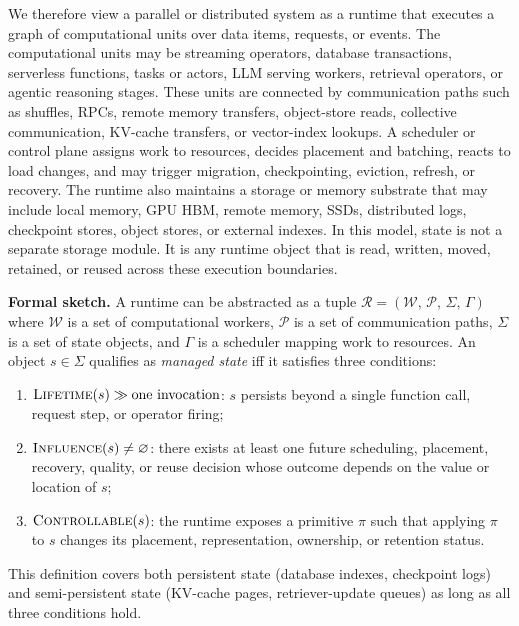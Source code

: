 \documentclass[acmsmall,screen,review]{acmart}
\begin{document}
We therefore view a parallel or distributed system as a runtime that executes a graph of computational units over data items, requests, or events. The computational units may be streaming operators, database transactions, serverless functions, tasks or actors, LLM serving workers, retrieval operators, or agentic reasoning stages. These units are connected by communication paths such as shuffles, RPCs, remote memory transfers, object-store reads, collective communication, KV-cache transfers, or vector-index lookups. A scheduler or control plane assigns work to resources, decides placement and batching, reacts to load changes, and may trigger migration, checkpointing, eviction, refresh, or recovery. The runtime also maintains a storage or memory substrate that may include local memory, GPU HBM, remote memory, SSDs, distributed logs, checkpoint stores, object stores, or external indexes. In this model, state is not a separate storage module. It is any runtime object that is read, written, moved, retained, or reused across these execution boundaries.

\smallskip\noindent\textbf{Formal sketch.}
A runtime can be abstracted as a tuple \(\mathcal{R}=(\mathcal{W},\,\mathcal{P},\,\Sigma,\,\Gamma)\) where
\(\mathcal{W}\) is a set of computational workers,
\(\mathcal{P}\) is a set of communication paths,
\(\Sigma\) is a set of state objects, and
\(\Gamma\) is a scheduler mapping work to resources.
An object \(s\in\Sigma\) qualifies as \emph{managed state} iff it satisfies three conditions:
\begin{enumerate}[leftmargin=*,nosep]
\item \(\textsc{Lifetime}(s)\gg\text{one invocation}\): \(s\) persists beyond a single function call, request step, or operator firing;
\item \(\textsc{Influence}(s)\neq\varnothing\): there exists at least one future scheduling, placement, recovery, quality, or reuse decision whose outcome depends on the value or location of \(s\);
\item \(\textsc{Controllable}(s)\): the runtime exposes a primitive \(\pi\) such that applying \(\pi\) to \(s\) changes its placement, representation, ownership, or retention status.
\end{enumerate}
This definition covers both persistent state (database indexes, checkpoint logs) and semi-persistent state (KV-cache pages, retriever-update queues) as long as all three conditions hold.
\end{document}

